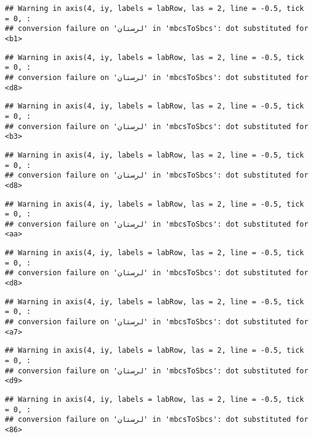 \documentclass[
]{article}
\begin{document}
\begin{verbatim}
## Warning in axis(4, iy, labels = labRow, las = 2, line = -0.5, tick = 0, :
## conversion failure on 'لرستان' in 'mbcsToSbcs': dot substituted for <b1>
\end{verbatim}

\begin{verbatim}
## Warning in axis(4, iy, labels = labRow, las = 2, line = -0.5, tick = 0, :
## conversion failure on 'لرستان' in 'mbcsToSbcs': dot substituted for <d8>
\end{verbatim}

\begin{verbatim}
## Warning in axis(4, iy, labels = labRow, las = 2, line = -0.5, tick = 0, :
## conversion failure on 'لرستان' in 'mbcsToSbcs': dot substituted for <b3>
\end{verbatim}

\begin{verbatim}
## Warning in axis(4, iy, labels = labRow, las = 2, line = -0.5, tick = 0, :
## conversion failure on 'لرستان' in 'mbcsToSbcs': dot substituted for <d8>
\end{verbatim}

\begin{verbatim}
## Warning in axis(4, iy, labels = labRow, las = 2, line = -0.5, tick = 0, :
## conversion failure on 'لرستان' in 'mbcsToSbcs': dot substituted for <aa>
\end{verbatim}

\begin{verbatim}
## Warning in axis(4, iy, labels = labRow, las = 2, line = -0.5, tick = 0, :
## conversion failure on 'لرستان' in 'mbcsToSbcs': dot substituted for <d8>
\end{verbatim}

\begin{verbatim}
## Warning in axis(4, iy, labels = labRow, las = 2, line = -0.5, tick = 0, :
## conversion failure on 'لرستان' in 'mbcsToSbcs': dot substituted for <a7>
\end{verbatim}

\begin{verbatim}
## Warning in axis(4, iy, labels = labRow, las = 2, line = -0.5, tick = 0, :
## conversion failure on 'لرستان' in 'mbcsToSbcs': dot substituted for <d9>
\end{verbatim}

\begin{verbatim}
## Warning in axis(4, iy, labels = labRow, las = 2, line = -0.5, tick = 0, :
## conversion failure on 'لرستان' in 'mbcsToSbcs': dot substituted for <86>
\end{verbatim}
\end{document}
